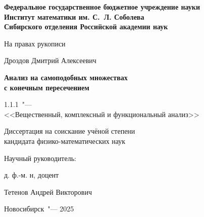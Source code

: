 \thispagestyle{empty}
\begin{center}
\textbf{
 Федеральное государственное бюджетное учреждение науки\\
Институт математики им. С.~Л. Соболева\\
Сибирского отделения Российской академии наук}
\end{center}

\vspace{0pt plus4fill}
\begin{flushright}
На правах рукописи
\end{flushright}


\vspace{0pt plus6fill}
\begin{center}
{\large Дроздов Дмитрий Алексеевич}
\end{center}

\vspace{0pt plus1fill}
\begin{center}
\textbf {\large %
Анализ на самоподобных множествах \\
с конечным пересечением}

\vspace{0pt plus2fill} 
{%
1.1.1\ "---\\
<<Вещественный, комплексный и функциональный анализ>>}

\vspace{0pt plus2fill}
Диссертация на соискание учёной степени\\
кандидата физико-математических наук
\end{center}

\vspace{0pt plus4fill}
\noindent\hspace{0.6\textwidth}Научный руководитель:

\noindent\hspace{0.6\textwidth}д. ф.-м. н, доцент

\noindent\hspace{0.6\textwidth}Тетенов Андрей Викторович


\vspace{0pt plus4fill}
{\centering Новосибирск\ "--- 2025\par}
